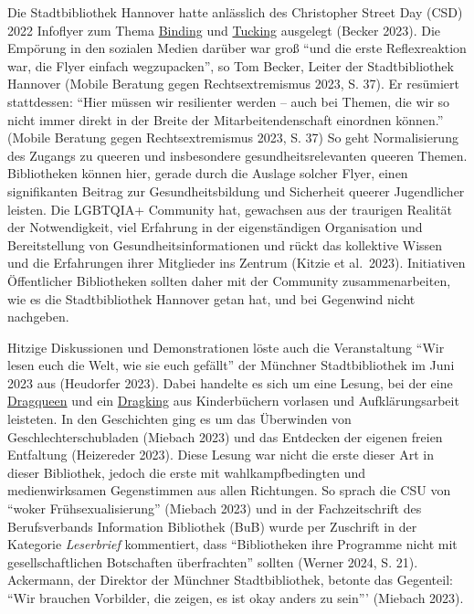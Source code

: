 \documentclass[a4paper,
fontsize=11pt,
oneside,
numbers=noperiodatend,
parskip=half-,
bibliography=totoc,
final
]{scrartcl}
\begin{document}
Die Stadtbibliothek Hannover hatte anlässlich des Christopher Street Day
(CSD) 2022 Infoflyer zum Thema
\href{https://trans.fandom.com/wiki/Binding}{Binding} und
\href{https://trans.fandom.com/wiki/Tucking}{Tucking} ausgelegt (Becker
2023). Die Empörung in den sozialen Medien darüber war groß \enquote{und
die erste Reflexreaktion war, die Flyer einfach wegzupacken}, so Tom
Becker, Leiter der Stadtbibliothek Hannover (Mobile Beratung gegen
Rechtsextremismus 2023, S. 37). Er resümiert stattdessen: \enquote{Hier
müssen wir resilienter werden -- auch bei Themen, die wir so nicht immer
direkt in der Breite der Mitarbeitendenschaft einordnen können.} (Mobile
Beratung gegen Rechtsextremismus 2023, S. 37) So geht Normalisierung des
Zugangs zu queeren und insbesondere gesundheitsrelevanten queeren
Themen. Bibliotheken können hier, gerade durch die Auslage solcher
Flyer, einen signifikanten Beitrag zur Gesundheitsbildung und Sicherheit
queerer Jugendlicher leisten. Die LGBTQIA+ Community hat, gewachsen aus
der traurigen Realität der Notwendigkeit, viel Erfahrung in der
eigenständigen Organisation und Bereitstellung von
Gesundheitsinformationen und rückt das kollektive Wissen und die
Erfahrungen ihrer Mitglieder ins Zentrum (Kitzie et al.~2023).
Initiativen Öffentlicher Bibliotheken sollten daher mit der Community
zusammenarbeiten, wie es die Stadtbibliothek Hannover getan hat, und bei
Gegenwind nicht nachgeben.

Hitzige Diskussionen und Demonstrationen löste auch die Veranstaltung
\enquote{Wir lesen euch die Welt, wie sie euch gefällt} der Münchner
Stadtbibliothek im Juni 2023 aus (Heudorfer 2023). Dabei handelte es
sich um eine Lesung, bei der eine
\href{https://queer-lexikon.net/2017/06/15/drag-queen/}{Dragqueen} und
ein \href{https://queer-lexikon.net/2017/06/15/drag-king/}{Dragking} aus
Kinderbüchern vorlasen und Aufklärungsarbeit leisteten. In den
Geschichten ging es um das Überwinden von Geschlechterschubladen
(Miebach 2023) und das Entdecken der eigenen freien Entfaltung
(Heizereder 2023). Diese Lesung war nicht die erste dieser Art in dieser
Bibliothek, jedoch die erste mit wahlkampfbedingten und medienwirksamen
Gegenstimmen aus allen Richtungen. So sprach die CSU von \enquote{woker
Frühsexualisierung} (Miebach 2023) und in der Fachzeitschrift des
Berufsverbands Information Bibliothek (BuB) wurde per Zuschrift in der
Kategorie \emph{Leserbrief} kommentiert, dass \enquote{Bibliotheken ihre
Programme nicht mit gesellschaftlichen Botschaften überfrachten} sollten
(Werner 2024, S. 21). Ackermann, der Direktor der Münchner
Stadtbibliothek, betonte das Gegenteil: \enquote{Wir brauchen Vorbilder, die
zeigen, es ist okay anders zu sein}' (Miebach 2023).
\end{document}
